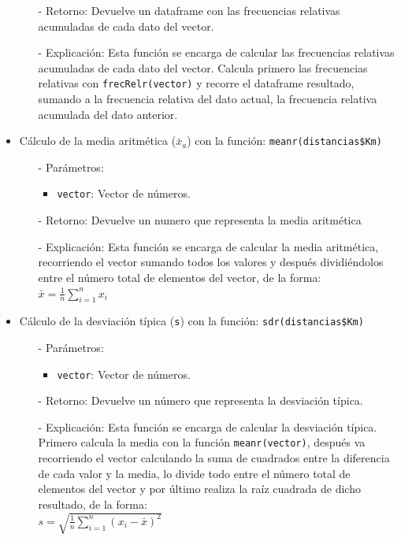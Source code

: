 \documentclass[a4paper, 12pt]{article}
\begin{document}
\begin{itemize}
\begin{itemize}
			\item[-] Retorno: Devuelve un dataframe con las frecuencias relativas acumuladas de cada dato del vector. 
			
			\item[-] Explicación: Esta función se encarga de calcular las frecuencias relativas acumuladas de cada dato del vector. Calcula primero las frecuencias relativas con \texttt{frecRelr(vector)} y recorre el dataframe resultado, sumando a la frecuencia relativa del dato actual, la frecuencia relativa acumulada del dato anterior.
		\end{itemize}
		
		\item Cálculo de la media aritmética (\texttt{$\bar{x}_{a}$}) con la función: \texttt{meanr(distancias\$Km)}
		\begin{itemize}
			\item[-] Parámetros: 
			\begin{itemize}
				\item \texttt{vector}: Vector de números.
			\end{itemize}
			
			\item[-] Retorno: Devuelve un numero que representa la media aritmética 
			
			\item[-] Explicación: Esta función se encarga de calcular la media aritmética, recorriendo el vector sumando todos los valores y después dividiéndolos entre el número total de elementos del vector, de la forma: \\
			$\bar{x} = \frac{1}{n} \sum_{i=1}^{n} x_i$
		\end{itemize}
		
		\item Cálculo de la desviación típica (\texttt{s}) con la función: \texttt{sdr(distancias\$Km)}
		\begin{itemize}
			\item[-] Parámetros: 
			\begin{itemize}
				\item \texttt{vector}: Vector de números.
			\end{itemize}
			
			\item[-] Retorno: Devuelve un número que representa la desviación típica. 
			
			\item[-] Explicación: Esta función se encarga de calcular la desviación típica. Primero calcula la media con la función \texttt{meanr(vector)}, después va recorriendo el vector calculando la suma de cuadrados entre la diferencia de cada valor y la media, lo divide todo entre el número total de elementos del vector y por último realiza la raíz cuadrada de dicho resultado, de la forma: \\
			$s = \sqrt{\frac{1}{n} \sum_{i=1}^{n} (x_i - \bar{x})^2}$
		\end{itemize}
		

\end{itemize}
\end{document}
